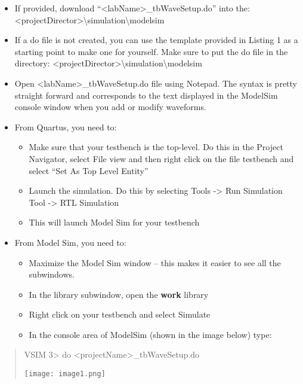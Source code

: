 \begin{itemize}
\item
  If provided, download
  ``\textless labName\textgreater\_tbWaveSetup.do'' into the:
  \textless projectDirector\textgreater\textbackslash simulation\textbackslash modelsim
\item
  If a do file is not created, you can use the template provided in
  Listing 1 as a starting point to make one for yourself. Make sure to
  put the do file in the directory:
  \textless projectDirector\textgreater\textbackslash simulation\textbackslash modelsim
\item
  Open \textless labName\textgreater\_tbWaveSetup.do file using Notepad.
  The syntax is pretty straight forward and corresponds to the text
  displayed in the ModelSim console window when you add or modify
  waveforms.
\item
  From Quartus, you need to:

  \begin{itemize}
  \item
    Make sure that your testbench is the top-level. Do this in the
    Project Navigator, select File view and then right click on the file
    testbench and select ``Set As Top Level Entity''
  \item
    Launch the simulation. Do this by selecting Tools -\textgreater{}
    Run Simulation Tool -\textgreater{} RTL Simulation
  \item
    This will launch Model Sim for your testbench
  \end{itemize}
\item
  From Model Sim, you need to:

  \begin{itemize}
  \item
    Maximize the Model Sim window -- this makes it easier to see all the
    subwindows.
  \item
    In the library subwindow, open the \textbf{work} library
  \item
    Right click on your testbench and select Simulate
  \item
    In the console area of ModelSim (shown in the image below) type:
  \end{itemize}
\end{itemize}

\begin{quote}
VSIM 3\textgreater{} do
\textless projectName\textgreater\_tbWaveSetup.do

\texttt{[image: image1.png]}
\end{quote}

